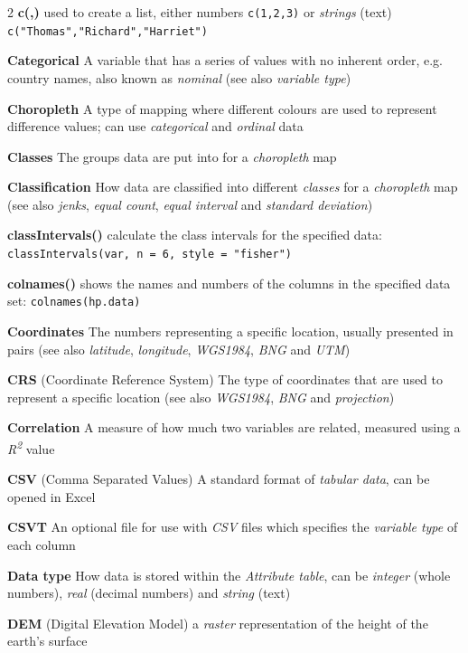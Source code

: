 \documentclass[a4paper,10pt]{article}
\begin{document}
\begin{multicols}{2}
\textbf{c(,)} used to create a list, either numbers \texttt{c(1,2,3)} or \textit{strings} (text) \texttt{c("Thomas","Richard","Harriet")}

\textbf{Categorical} A variable that has a series of values with no inherent order, e.g. country names, also known as \textit{nominal} (see also \textit{variable type}) 

\textbf{Choropleth} A type of mapping where different colours are used to represent difference values; can use \textit{categorical} and \textit{ordinal} data

\textbf{Classes} The groups data are put into for a \textit{choropleth} map

\textbf{Classification} How data are classified into different \textit{classes} for a \textit{choropleth} map (see also \textit{jenks}, \textit{equal count}, \textit{equal interval} and \textit{standard deviation})

\textbf{classIntervals()} calculate the class intervals for the specified data: \texttt{classIntervals(var, n = 6, style = "fisher")}

\textbf{colnames()} shows the names and numbers of the columns in the specified data set: \texttt{colnames(hp.data)}

\textbf{Coordinates} The numbers representing a specific location, usually presented in pairs (see also \textit{latitude}, \textit{longitude}, \textit{WGS1984}, \textit{BNG} and \textit{UTM})

\textbf{CRS} (Coordinate Reference System) The type of coordinates that are used to represent a specific location (see also \textit{WGS1984}, \textit{BNG} and \textit{projection})

\textbf{Correlation} A measure of how much two variables are related, measured using a \textit{R\textsuperscript{2}} value 

\textbf{CSV} (Comma Separated Values) A standard format of \textit{tabular data}, can be opened in Excel  

\textbf{CSVT} An optional file for use with \textit{CSV} files which specifies the \textit{variable type} of each column %

\textbf{Data type} How data is stored within the \textit{Attribute table}, can be \textit{integer} (whole numbers), \textit{real} (decimal numbers) and \textit{string} (text) 

\textbf{DEM} (Digital Elevation Model) a \textit{raster} representation of the height of the earth's surface


\end{multicols}
\end{document}
